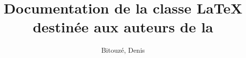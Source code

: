 \documentclass{gztarticle}
\begin{document}
\title[short=Documentation \LaTeX{} destinée aux auteurs de la
\emph{Gazette}]{Documentation de la classe \LaTeX{} destinée aux auteurs de la
  \gzt{}}
%
\author[%
affiliation={%
  Université du Littoral Côte d'Opale, Laboratoire de mathématiques pures et
  appliquées%
},%
photo=Denis,%
email=denis.bitouze@lmpa.univ-littoral.fr,%
webpage=http://gte.univ-littoral.fr/members/dbitouze/pub/latex/,%
]{Bitouzé, Denis}
%
\maketitle*
%
\localtableofcontents
%




%
\printindex
%
\printbibliography
\end{document}
